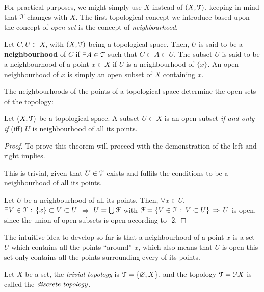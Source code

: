 For practical purposes, we might simply use $X$ instead of $(X, \EuScript{T})$, keeping in mind
that $\EuScript{T}$ changes with $X$.
The first topological concept we introduce based upon the concept of \emph{open set} is
the concept of \emph{neighbourhood}.

\begin{definition}
	\label{def:neighbourhood}
	Let $C, U\subset X$, with $(X, \EuScript{T})$ being a topological space. Then, $U$ is said to
	be a \textbf{neighbourhood} of $C$ if $\exists A\in\EuScript{T}$ such that $C\subset A \subset U$.
	The subset $U$ is said to be a neighbourhood of a point $x\in X$ if $U$ is a
	neighbourhood of $\{x\}$.
	An open neighbourhood of $x$ is simply an open subset of $X$ containing $x$.
\end{definition}

The neighbourhoods of the points of a topological space determine the open sets of the topology:

\begin{theorem}
	Let $(X, \EuScript{T})$ be a topological space. A subset $U\subset X$ is an open subset
	\emph{if and only if} (iff) $U$ is neighbourhood of all its points.
\end{theorem}

\begin{proof} To prove this theorem will proceed with the demonstration of the left and
right implies.

\noindent{$\boxed{\Rightarrow}$} This is trivial, given that $U\in\EuScript{T}$ exists and
fulfils the conditions to be a neighbourhood of all its points.

\noindent{$\boxed{\Leftarrow}$} Let $U$ be a neighbourhood of all its points.
Then, $\forall x\in U$, $\exists V\in \EuScript{T}\,:\,\{x\}\subset V\subset U$ $\Rightarrow$
$U = \bigcup\EuScript{F}$ with $\EuScript{F}=\{V\in\EuScript{T}\,:\,V\subset U\}\,\Rightarrow\,U$ is open, since the union
of open subsets is open according to -2.
\end{proof}

The intuitive idea to develop so far is that a neighbourhood of a point $x$ is a set
$U$ which contains all the points ``around'' $x$, which also means that $U$ is open
\iff this set only contains all the points surrounding every of its points.

\begin{example}
	Let $X$ be a set, the \emph{trivial topology} is $\EuScript{T}=\{\varnothing, X\}$, and the
	topology $\EuScript{T}=\EuScript{P} X$ is called the $\emph{discrete topology}$.
\end{example}

